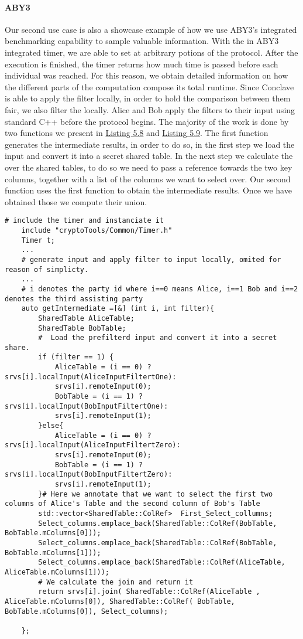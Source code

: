 \paragraph{ABY3}
Our second use case is also a showcase example of how we use ABY3's integrated benchmarking capability to sample valuable information. With the in ABY3 integrated timer, we are able to set  at arbitrary potions of the protocol. After the execution is finished, the timer returns how much time is passed before each individual  was reached. For this reason, we obtain detailed information on how the different parts of the computation compose its total runtime. Since Conclave is able to apply the filter locally, in order to hold the comparison between them fair, we also filter the locally. Alice and Bob apply the filters to their input using standard C++ before the protocol begins. The majority of the work is done by two functions we present in \hyperref[Listing 5.6]{Listing 5.8} and \hyperref[Listing 5.7]{Listing 5.9}. The first function generates the intermediate results, in order to do so, in the first step we load the input and convert it into a secret shared table. In the next step we calculate the  over the shared tables, to do so we need to pass a reference towards the two key columns, together with a list of the columns we want to select over. Our second function uses the first function to obtain the intermediate results. Once we have obtained those we compute their union.       
\label{Listing 5.6}    
 \begin{lstlisting}[caption={Function for our second use case that generates an intermediate result}]
	# include the timer and instanciate it
	include "cryptoTools/Common/Timer.h"
	Timer t;
	...
	# generate input and apply filter to input locally, omited for reason of simplicty.
	...
	# i denotes the party id where i==0 means Alice, i==1 Bob and i==2 denotes the third assisting party
	auto getIntermediate =[&] (int i, int filter){
		SharedTable AliceTable;
		SharedTable BobTable;
		#  Load the prefilterd input and convert it into a secret share. 
		if (filter == 1) { 
			AliceTable = (i == 0) ? srvs[i].localInput(AliceInputFiltertOne): 
			srvs[i].remoteInput(0); 
			BobTable = (i == 1) ? srvs[i].localInput(BobInputFiltertOne): 
			srvs[i].remoteInput(1);
		}else{
			AliceTable = (i == 0) ? srvs[i].localInput(AliceInputFiltertZero): 
			srvs[i].remoteInput(0);
			BobTable = (i == 1) ? srvs[i].localInput(BobInputFiltertZero): 
			srvs[i].remoteInput(1);
		}# Here we annotate that we want to select the first two columns of Alice's Table and the second column of Bob's Table
		std::vector<SharedTable::ColRef>  First_Select_collumns; 
		Select_columns.emplace_back(SharedTable::ColRef(BobTable, BobTable.mColumns[0]));
		Select_columns.emplace_back(SharedTable::ColRef(BobTable, BobTable.mColumns[1]));
		Select_columns.emplace_back(SharedTable::ColRef(AliceTable, AliceTable.mColumns[1]));
		# We calculate the join and return it
		return srvs[i].join( SharedTable::ColRef(AliceTable , AliceTable.mColumns[0]), SharedTable::ColRef( BobTable, BobTable.mColumns[0]), Select_columns);
		
	};
\end{lstlisting}
